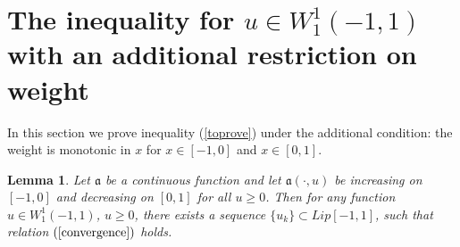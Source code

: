 \documentclass[12pt]{article}
\renewcommand{\ge}{\geqslant}
\newtheorem{lm}{Lemma}
\newcommand{\W}{W_1^1}
\begin{document}
\section{The inequality for $u \in \W(-1, 1)$ with an additional restriction on weight}
\label{ASC}

In this section we prove inequality (\ref{toprove}) under the additional condition:
the weight is monotonic in $x$ for $x \in [-1, 0]$ and $x \in [0, 1]$.

\begin{lm}
\label{Wapprox}
Let $\mathfrak a$ be a continuous function
and let $\mathfrak a(\cdot, u)$ be increasing on $[-1, 0]$ and decreasing on $[0, 1]$ for all $u \ge 0$.
Then for any function $u \in \W(-1, 1)$, $u \ge 0$,
there exists a sequence $\{u_k\} \subset Lip[-1, 1]$, such that relation $(\ref{convergence})$ holds.
\end{lm}
\end{document}
